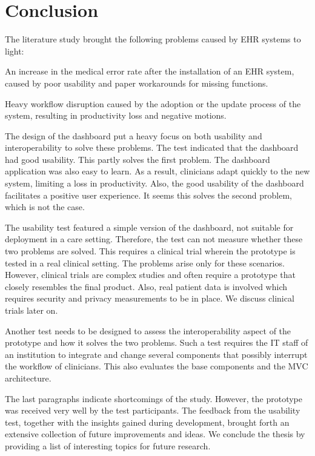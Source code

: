 \section{Conclusion}

The literature study brought the following problems caused by EHR systems to light:
\begin{myitemize}
    \item An increase in the medical error rate after the installation of an EHR system, caused by poor usability and paper workarounds for missing functions.
    \item Heavy workflow disruption caused by the adoption or the update process of the system, resulting in productivity loss and negative motions.
\end{myitemize}

\noindent The design of the dashboard put a heavy focus on both usability and interoperability to solve these problems. The test indicated that the dashboard had good usability. This partly solves the first problem. The dashboard application was also easy to learn. As a result, clinicians adapt quickly to the new system, limiting a loss in productivity. Also, the good usability of the dashboard facilitates a positive user experience. It seems this solves the second problem, which is not the case.

The usability test featured a simple version of the dashboard, not suitable for deployment in a care setting. Therefore, the test can not measure whether these two problems are solved. This requires a clinical trial wherein the prototype is tested in a real clinical setting. The problems arise only for these scenarios. However, clinical trials are complex studies and often require a prototype that closely resembles the final product. Also, real patient data is involved which requires security and privacy measurements to be in place. We discuss clinical trials later on.

Another test needs to be designed to assess the interoperability aspect of the prototype and how it solves the two problems. Such a test requires the IT staff of an institution to integrate and change several components that possibly interrupt the workflow of clinicians. This also evaluates the base components and the MVC architecture.

The last paragraphs indicate shortcomings of the study. However, the prototype was received very well by the test participants. The feedback from the usability test, together with the insights gained during development, brought forth an extensive collection of future improvements and ideas. We conclude the thesis by providing a list of interesting topics for future research.

